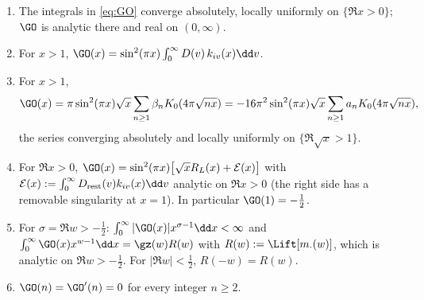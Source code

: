 \begin{theorem}\label{thm:lift}
\begin{enumerate}[label=\textup{(\alph*)}]
\item The integrals in \eqref{eq:GO} converge absolutely, locally uniformly on $\{\Re x>0\}$; $\GO$ is analytic there and real on $(0,\infty)$.
\item For $x>1$, $\GO(x)=\sin^2(\pi x)\int_0^\infty D(v)\,k_{iv}(x)\dd v$.
\item For $x>1$,
\[
\GO(x)=\pi\sin^2(\pi x)\sqrt x\sum_{n\ge1}\beta_nK_0(4\pi\sqrt{nx})=-16\pi^2\sin^2(\pi x)\sqrt x\sum_{n\ge1}a_nK_0(4\pi\sqrt{nx}),
\]
the series converging absolutely and locally uniformly on $\{\Re\sqrt x>1\}$.
\item For $\Re x>0$, $\GO(x)=\sin^2(\pi x)\big[\sqrt xR_L(x)+\mathcal E(x)\big]$ with $\mathcal E(x):=\int_0^\infty D_{\rm rest}(v)k_{iv}(x)\dd v$
analytic on $\Re x>0$ (the right side has a removable singularity at $x=1$). In particular $\GO(1)=-\frac12$.
\item For $\sigma=\Re w>-\frac12$: $\int_0^\infty|\GO(x)|x^{\sigma-1}\dd x<\infty$ and $\int_0^\infty\GO(x)x^{w-1}\dd x=\gz(w)R(w)$ with
$R(w):=\Lift[m_\cdot(w)]$, which is analytic on $\Re w>-\frac12$. For $|\Re w|<\frac12$, $R(-w)=R(w)$.
\item $\GO(n)=\GO'(n)=0$ for every integer $n\ge2$.
\end{enumerate}
\end{theorem}

